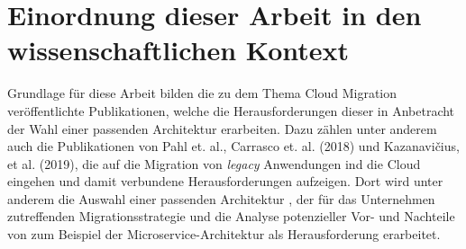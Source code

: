 \section{Einordnung dieser Arbeit in den wissenschaftlichen Kontext}

Grundlage für diese Arbeit bilden die zu dem Thema Cloud Migration veröffentlichte Publikationen, welche die Herausforderungen dieser in Anbetracht der Wahl einer passenden Architektur erarbeiten. Dazu zählen unter anderem auch die Publikationen von Pahl et. al., Carrasco et. al. (2018) und Kazanavičius, et al. (2019), die auf die Migration von \textit{legacy} Anwendungen ind die Cloud eingehen und damit verbundene Herausforderungen aufzeigen. Dort wird unter anderem die Auswahl einer passenden Architektur \cite[Vgl.][S. 14]{Pahl}, der für das Unternehmen zutreffenden Migrationsstrategie \cite[Vgl.][S. 4]{Kazanavicius2019} und die Analyse potenzieller Vor- und Nachteile von zum Beispiel der Microservice-Architektur \cite[Vgl.][S. 3]{Carrasco2018} als Herausforderung erarbeitet.